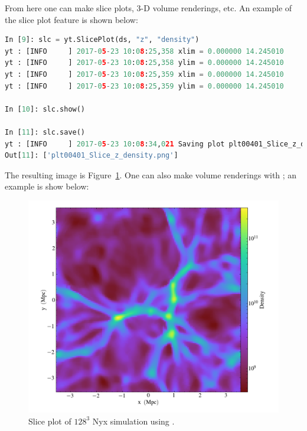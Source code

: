 From here one can make slice plots, 3-D volume renderings, etc. An example of
the slice plot feature is shown below:

\begin{lstlisting}[language=python,breaklines=true]
In [9]: slc = yt.SlicePlot(ds, "z", "density")
yt : [INFO     ] 2017-05-23 10:08:25,358 xlim = 0.000000 14.245010
yt : [INFO     ] 2017-05-23 10:08:25,358 ylim = 0.000000 14.245010
yt : [INFO     ] 2017-05-23 10:08:25,359 xlim = 0.000000 14.245010
yt : [INFO     ] 2017-05-23 10:08:25,359 ylim = 0.000000 14.245010

In [10]: slc.show()

In [11]: slc.save()
yt : [INFO     ] 2017-05-23 10:08:34,021 Saving plot plt00401_Slice_z_density.png
Out[11]: ['plt00401_Slice_z_density.png']
\end{lstlisting}

The resulting image is Figure~\ref{fig:yt_Nyx_slice_plot}. One can also make
volume renderings with \yt; an example is show below:

\begin{figure}
  \includegraphics[scale=0.5]{./Visualization/yt_Nyx_density_slice.png}
  \caption{Slice plot of $128^3$ Nyx simulation using \yt.}
  \label{fig:yt_Nyx_slice_plot}
\end{figure}

